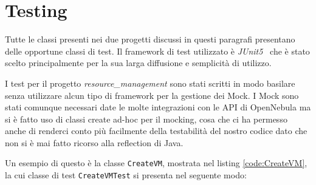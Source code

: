 \section{Testing}
Tutte le classi presenti nei due progetti discussi in questi paragrafi presentano delle opportune classi di test. Il framework di test utilizzato è \emph{JUnit5}~\cite{junit5} che è stato scelto principalmente per la sua larga diffusione e semplicità di utilizzo.\par
I test per il progetto \emph{resource\_management} sono stati scritti in modo basilare senza utilizzare alcun tipo di framework per la gestione dei Mock. I Mock sono stati comunque necessari date le molte integrazioni con le API di OpenNebula ma si è fatto uso di classi create ad-hoc per il mocking, cosa che ci ha permesso anche di renderci conto più facilmente della testabilità del nostro codice dato che non si è mai fatto ricorso alla reflection di Java.\par
Un esempio di questo è la classe \texttt{CreateVM}, mostrata nel listing \ref{code:CreateVM}, la cui classe di test \texttt{CreateVMTest} si presenta nel seguente modo:
